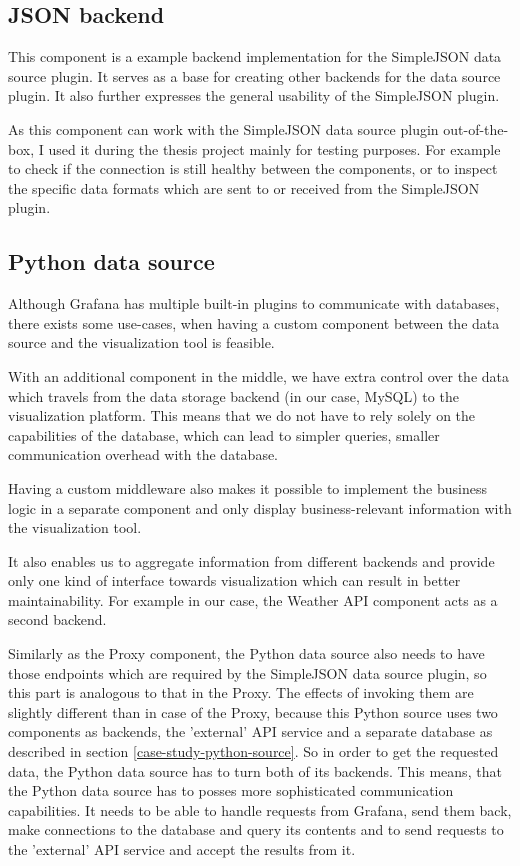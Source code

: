 \subsection{JSON backend}
This component is a example backend implementation for the SimpleJSON data source plugin. It serves as a base for creating other backends for the data source plugin. It also further expresses the general usability of the SimpleJSON plugin.

As this component can work with the SimpleJSON data source plugin out-of-the-box, I used it during the thesis project mainly for testing purposes. For example to check if the connection is still healthy between the components, or to inspect the specific data formats which are sent to or received from the SimpleJSON plugin.

\subsection{Python data source}

Although Grafana has multiple built-in plugins to communicate with databases, there exists some use-cases, when having a custom component between the data source and the visualization tool is feasible.

With an additional component in the middle, we have extra control over the data which travels from the data storage backend (in our case, MySQL) to the visualization platform. This means that we do not have to rely solely on the capabilities of the database, which can lead to simpler queries, smaller communication overhead with the database.

Having a custom middleware also makes it possible to implement the business logic in a separate component and only display business-relevant information with the visualization tool.

It also enables us to aggregate information from different backends and provide only one kind of interface towards visualization which can result in better maintainability. For example in our case, the Weather API component acts as a second backend.

Similarly as the Proxy component, the Python data source also needs to have those endpoints which are required by the SimpleJSON data source plugin, so this part is analogous to that in the Proxy. The effects of invoking them are slightly different than in case of the Proxy, because this Python source uses two components as backends, the 'external' API service and a separate database as described in section \ref{case-study-python-source}. So in order to get the requested data, the Python data source has to turn both of its backends. This means, that the Python data source has to posses more sophisticated communication capabilities. It needs to be able to handle requests from Grafana, send them back, make connections to the database and query its contents and to send requests to the 'external' API service and accept the results from it.

